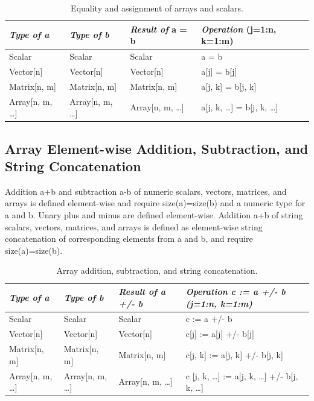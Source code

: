 \documentclass[10pt,a4paper]{report}
\def\doublelabel#1{\label{#1}\hypertarget{#1}{}}
\begin{document}
\begin{longtable}[]{|l|l|l|l|}
\caption{Equality and assignment of arrays and scalars.}\\
\hline
\emph{Type of a} & \emph{Type of b} & \emph{Result of} a = b & \emph{Operation} (j=1:n, k=1:m)\\ \hline
\endhead
Scalar & Scalar & Scalar & a = b\\ \hline
Vector{[}n{]} & Vector{[}n{]} & Vector{[}n{]} & a{[}j{]} =
b{[}j{]}\\ \hline
Matrix{[}n, m{]} & Matrix{[}n, m{]} & Matrix{[}n, m{]} & a{[}j, k{]} =
b{[}j, k{]}\\ \hline
Array{[}n, m, \ldots{}{]} & Array{[}n, m, \ldots{}{]} & Array{[}n, m,
\ldots{}{]} & a{[}j, k, \ldots{}{]} = b{[}j, k,
\ldots{}{]}\\ \hline
\end{longtable}

\subsection{Array Element-wise Addition, Subtraction, and String Concatenation}\doublelabel{array-element-wise-addition-subtraction-and-string-concatenation}

Addition a+b and subtraction a-b of numeric scalars, vectors, matrices,
and arrays is defined element-wise and require size(a)=size(b) and a
numeric type for a and b. Unary plus and minus are defined element-wise.
Addition a+b of string scalars, vectors, matrices, and arrays is defined
as element-wise string concatenation of corresponding elements from a
and b, and require size(a)=size(b).

\begin{longtable}[]{|l|l|l|l|}
\caption{Array addition, subtraction, and string concatenation.}\\
\hline
\emph{Type of a} & \emph{Type of b} & \emph{Result of a +/- b} &
\emph{Operation c := a +/- b (j=1:n, k=1:m)}\\ \hline
\endhead
Scalar & Scalar & Scalar & c := a +/- b\\ \hline
Vector{[}n{]} & Vector{[}n{]} & Vector{[}n{]} & c{[}j{]} := a{[}j{]} +/-
b{[}j{]}\\ \hline
Matrix{[}n, m{]} & Matrix{[}n, m{]} & Matrix{[}n, m{]} & c{[}j, k{]} :=
a{[}j, k{]} +/- b{[}j, k{]}\\ \hline
Array{[}n, m, \ldots{}{]} & Array{[}n, m, \ldots{}{]} & Array{[}n, m,
\ldots{}{]} & c {[}j, k, \ldots{}{]} := a{[}j, k, \ldots{}{]} +/- b{[}j,
k, \ldots{}{]}\\ \hline
\end{longtable}
\end{document}
